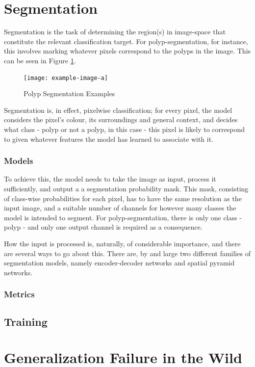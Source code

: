     
\section{Segmentation}
    Segmentation is the task of determining the region(s) in image-space that constitute the relevant classification target. For polyp-segmentation, for instance, this involves marking whatever pixels correspond to the polyps in the image. This can be seen in Figure \ref{fig:segmentation}. 
    \begin{figure}[ht]
        \centering
        \texttt{[image: example-image-a]}
        \caption{Polyp Segmentation Examples}
        \label{fig:segmentation}
    \end{figure}
    Segmentation is, in effect, pixelwise classification; for every pixel, the model considers the pixel's colour, its surroundings and general context, and decides what class - polyp or not a polyp, in this case - this pixel is likely to correspond to given whatever features the model has learned to associate with it.  
    
    \subsubsection{Models}
    To achieve this, the model needs to take the image as input, process it sufficiently, and output a a segmentation probability mask. This mask, consisting of class-wise probabilities for each pixel, has to have the same resolution as the input image, and a suitable number of channels for however many classes the model is intended to segment. For polyp-segmentation, there is only one class - polyp - and only one output channel is required as a consequence. 
    
    How the input is processed is, naturally, of considerable importance, and there are several ways to go about this. There are, by and large two different families of segmentation models, namely encoder-decoder networks and spatial pyramid networks.
    
    \subsubsection{Metrics}
    \subsection{Training}
    

\section{Generalization Failure in the Wild} \label{case_studies}
	
